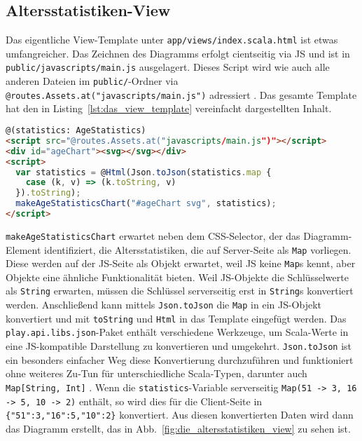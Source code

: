 
\subsection{Altersstatistiken-View} %
\label{sub:altersstatistiken_view}

Das eigentliche View-Template unter \lstinline|app/views/index.scala.html| ist etwas umfangreicher.
Das Zeichnen des Diagramms erfolgt cientseitig via JS und ist in \lstinline|public/javascripts/main.js| ausgelagert.
Dieses Script wird wie auch alle anderen Dateien im \lstinline|public/|-Ordner via \lstinline|@routes.Assets.at("javascripts/main.js")| adressiert \cite[vgl.][S.~111]{play_for_scala}.
Das gesamte Template hat den in Listing~\ref{lst:das_view_template} vereinfacht dargestellten Inhalt.

\begin{lstlisting}[language=html,caption=Das View-Template, label=lst:das_view_template]
@(statistics: AgeStatistics)
<script src="@routes.Assets.at("javascripts/main.js")"></script>
<div id="ageChart"><svg></svg></div>
<script>
  var statistics = @Html(Json.toJson(statistics.map {
    case (k, v) => (k.toString, v)
  }).toString);
  makeAgeStatisticsChart("#ageChart svg", statistics);
</script>
\end{lstlisting}

\lstinline|makeAgeStatisticsChart| erwartet neben dem CSS-Selector, der das Diagramm-Element identifiziert, die Altersstatistiken, die auf Server-Seite als \lstinline|Map| vorliegen.
Diese werden auf der JS-Seite als Objekt erwartet, weil JS keine \lstinline|Map|s kennt, aber Objekte eine ähnliche Funktionalität bieten.
Weil JS-Objekte die Schlüsselwerte als \lstinline|String| erwarten, müssen die Schlüssel serverseitig erst in \lstinline|String|s konvertiert werden.
Anschließend kann mittels \lstinline|Json.toJson| die \lstinline|Map| in ein JS-Objekt konvertiert und mit \lstinline|toString| und \lstinline|Html| in das Template eingefügt werden.
Das \lstinline|play.api.libs.json|-Paket enthält verschiedene Werkzeuge, um Scala-Werte in eine JS-kompatible Darstellung zu konvertieren und umgekehrt.
\lstinline|Json.toJson| ist ein besonders einfacher Weg diese Konvertierung durchzuführen und funktioniert ohne weiteres Zu-Tun für unterschiedliche Scala-Typen, darunter auch \lstinline|Map[String, Int]| \cite[vgl.][S.~214--215]{play_for_scala}.
Wenn die \lstinline|statistics|-Variable serverseitig \lstinline|Map(51 -> 3, 16 -> 5, 10 -> 2)| enthält, so wird dies für die Client-Seite in \lstinline|{"51":3,"16":5,"10":2}| konvertiert.
Aus diesen konvertierten Daten wird dann das Diagramm erstellt, das in Abb.~\ref{fig:die_altersstatistiken_view} zu sehen ist.

